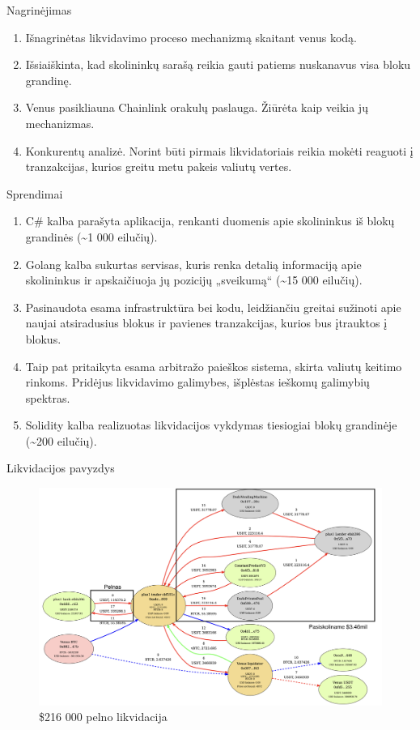 \documentclass[12pt]{beamer}
\begin{document}
\begin{frame}{Nagrinėjimas}
  \begin{enumerate}
    \item Išnagrinėtas likvidavimo proceso mechanizmą skaitant venus kodą.
    \item Išsiaiškinta, kad skolininkų sarašą reikia gauti patiems nuskanavus visa bloku grandinę.
    \item Venus pasikliauna Chainlink orakulų paslauga. Žiūrėta kaip veikia jų mechanizmas.
    \item Konkurentų analizė. Norint būti pirmais likvidatoriais reikia mokėti reaguoti į tranzakcijas, kurios greitu metu pakeis valiutų vertes.
  \end{enumerate}
\end{frame}

\begin{frame}{Sprendimai}
  \begin{enumerate}
    \item C\# kalba parašyta aplikacija, renkanti duomenis apie skolininkus iš blokų grandinės (\textasciitilde{}1 000 eilučių).
    \item Golang kalba sukurtas servisas, kuris renka detalią informaciją apie skolininkus ir apskaičiuoja jų pozicijų „sveikumą“ (\textasciitilde{}15 000 eilučių).
    \item Pasinaudota esama infrastruktūra bei kodu, leidžiančiu greitai sužinoti apie naujai atsiradusius blokus ir pavienes tranzakcijas, kurios bus įtrauktos į blokus.
    \item Taip pat pritaikyta esama arbitražo paieškos sistema, skirta valiutų keitimo rinkoms. Pridėjus likvidavimo galimybes, išplėstas ieškomų galimybių spektras.
    \item Solidity kalba realizuotas likvidacijos vykdymas tiesiogiai blokų grandinėje (\textasciitilde{}200 eilučių).
  \end{enumerate}
\end{frame}

\begin{frame}{Likvidacijos pavyzdys}
  \begin{figure}[H]
    \centering
    \includegraphics[scale=0.28]{resources/likvidacija.png}
    \caption{\$216 000 pelno likvidacija}
    \label{img:likvidacija}
  \end{figure}
\end{frame}
\end{document}
